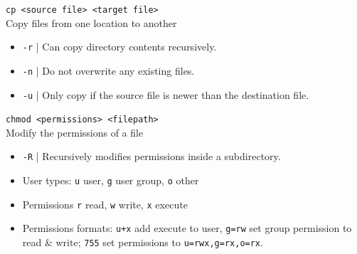 \documentclass[a4paper,11pt,parskip=half-]{scrartcl}
\begin{document}
\Large \texttt{cp <source file> <target file>} \normalsize \\
Copy files from one location to another
\begin{itemize}
    \item \texttt{-r} | Can copy directory contents recursively.
    \item \texttt{-n} | Do not overwrite any existing files.
    \item \texttt{-u} | Only copy if the source file is newer than the destination file.
\end{itemize}

\Large \texttt{chmod <permissions> <filepath>} \normalsize \\
Modify the permissions of a file
\begin{itemize}
    \item \texttt{-R} | Recursively modifies permissions inside a subdirectory.
    \item User types: \texttt{u} user, \texttt{g} user group, \texttt{o} other
    \item Permissions \texttt{r} read, \texttt{w} write, \texttt{x} execute
    \item Permissions formats: \texttt{u+x} add execute to user, \texttt{g=rw} set group permission to read & write; \texttt{755} set permissions to \texttt{u=rwx,g=rx,o=rx}.
\end{itemize}
\end{document}
